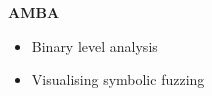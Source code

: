 \begin{frame}

	\begin{columns}[t]
		\begin{column}{0.6\textwidth}
			\textbf{AMBA}
			\small
			\begin{itemize}
				\item Binary level analysis
				\item Visualising symbolic fuzzing
			\end{itemize}
		\end{column}
	\end{columns}
\end{frame}

